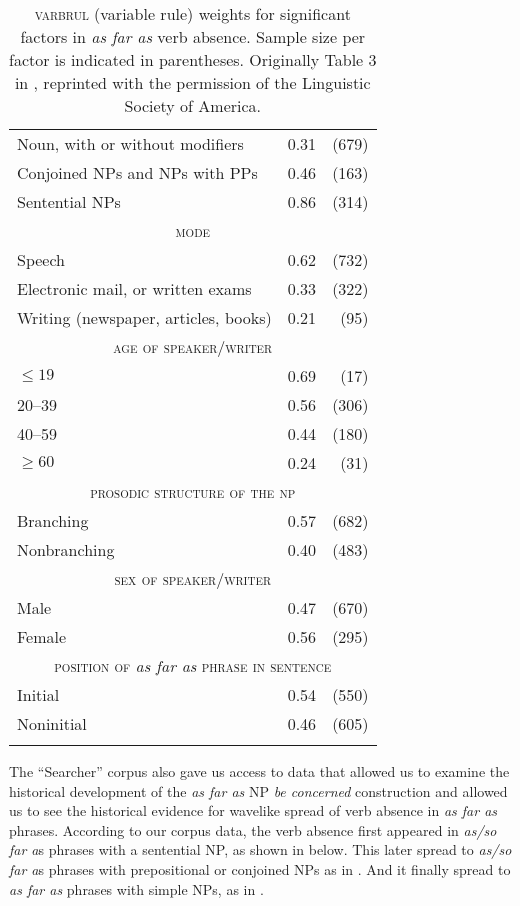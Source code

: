 \documentclass[output=paper,colorlinks,citecolor=brown]{langscibook}
\begin{document}
\begin{table}
\begin{tabular}{lrr}
\lsptoprule
\multicolumn{3}{c}{\textsc{syntactic complexity of the np}}\\
\midrule
Noun, with or without modifiers & 0.31 & (679)\\
Conjoined NPs and NPs with PPs & 0.46 & (163)\\
Sentential NPs & 0.86 & (314)\\
\midrule
\multicolumn{3}{c}{\textsc{mode}}\\
\midrule
Speech & 0.62 & (732)\\
Electronic mail, or written exams &0.33 & (322)\\
Writing (newspaper, articles, books) & 0.21 & (95)\\
\midrule
\multicolumn{3}{c}{\textsc{age of speaker/writer}}\\
\midrule
$\leq 19$ &0.69 & (17)\\
20--39 & 0.56 & (306)\\
40--59 &0.44 & (180)\\
$\geq 60$ & 0.24 & (31)\\
\midrule
\multicolumn{3}{c}{\textsc{prosodic structure of the np}}\\
\midrule
Branching & 0.57 & (682)\\
Nonbranching & 0.40&(483)\\
\midrule
\multicolumn{3}{c}{\textsc{sex of speaker/writer}}\\
\midrule
Male & 0.47 &(670)\\
Female & 0.56 &(295)\\
\midrule
\multicolumn{3}{c}{\textsc{position of} \textit{as far as} {\textsc{phrase in sentence}}}\\
\midrule
Initial& 0.54 &(550) \\
Noninitial & 0.46 &(605)\\
\lspbottomrule
\end{tabular}
\caption{\textsc{varbrul} (variable rule) weights for significant factors in \textit{as far as} verb absence. Sample size per factor is indicated in parentheses.  Originally Table 3 in \citet{RickfordEspinoza1995}, reprinted with the permission of the Linguistic Society of America.\label{tab:2 rickford:2}}
\end{table}    
 

The “Searcher” corpus also gave us access to data that allowed us to examine the historical development of the \textit{as far as} NP \textit{be concerned} construction and allowed us to see the historical evidence for wavelike spread of verb absence in \textit{as far as} phrases. According to our corpus data, the verb absence first appeared in \textit{as/so far a}s phrases with a sentential NP, as shown in  below. This later spread to \textit{as/so far a}s phrases with prepositional or conjoined NPs as in . And it finally spread to \textit{as far as} phrases with simple NPs, as in . 
\end{document}
